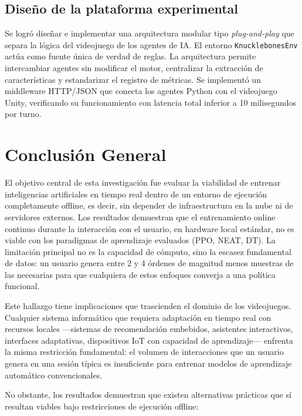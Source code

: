 \subsection{Diseño de la plataforma experimental}

Se logró diseñar e implementar una arquitectura modular tipo \textit{plug-and-play} que separa la lógica del videojuego de los agentes de IA. El entorno \texttt{KnucklebonesEnv} actúa como fuente única de verdad de reglas. La arquitectura permite intercambiar agentes sin modificar el motor, centralizar la extracción de características y estandarizar el registro de métricas. Se implementó un middleware HTTP/JSON que conecta los agentes Python con el videojuego Unity, verificando su funcionamiento con latencia total inferior a 10 milisegundos por turno.

\section{Conclusión General}

El objetivo central de esta investigación fue evaluar la viabilidad de entrenar inteligencias artificiales en tiempo real dentro de un entorno de ejecución completamente offline, es decir, sin depender de infraestructura en la nube ni de servidores externos. Los resultados demuestran que el entrenamiento online continuo durante la interacción con el usuario, en hardware local estándar, no es viable con los paradigmas de aprendizaje evaluados (PPO, NEAT, DT). La limitación principal no es la capacidad de cómputo, sino la escasez fundamental de datos: un usuario genera entre 2 y 4 órdenes de magnitud menos muestras de las necesarias para que cualquiera de estos enfoques converja a una política funcional.

Este hallazgo tiene implicaciones que trascienden el dominio de los videojuegos. Cualquier sistema informático que requiera adaptación en tiempo real con recursos locales ---sistemas de recomendación embebidos, asistentes interactivos, interfaces adaptativas, dispositivos IoT con capacidad de aprendizaje--- enfrenta la misma restricción fundamental: el volumen de interacciones que un usuario genera en una sesión típica es insuficiente para entrenar modelos de aprendizaje automático convencionales.

No obstante, los resultados demuestran que existen alternativas prácticas que sí resultan viables bajo restricciones de ejecución offline:

